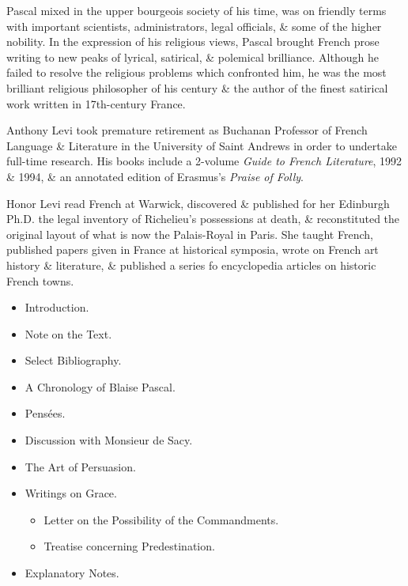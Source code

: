 \documentclass{article}
\begin{document}
\begin{enumerate}
	{\sc Pascal} mixed in the upper bourgeois society of his time, was on friendly terms with important scientists, administrators, legal officials, \& some of the higher nobility. In the expression of his religious views, {\sc Pascal} brought French prose writing to new peaks of lyrical, satirical, \& polemical brilliance. Although he failed to resolve the religious problems which confronted him, he was the most brilliant religious philosopher of his century \& the author of the finest satirical work written in 17th-century France.
	
	{\sc Anthony Levi} took premature retirement as Buchanan Professor of French Language \& Literature in the University of Saint Andrews in order to undertake full-time research. His books include a 2-volume {\it Guide to French Literature}, 1992 \& 1994, \& an annotated edition of {\sc Erasmus}'s {\it Praise of Folly}.
	
	{\sc Honor Levi} read French at Warwick, discovered \& published for her Edinburgh Ph.D. the legal inventory of Richelieu's possessions at death, \& reconstituted the original layout of what is now the Palais-Royal in Paris. She taught French, published papers given in France at historical symposia, wrote on French art history \& literature, \& published a series fo encyclopedia articles on historic French towns.
	\begin{itemize}
		\item {\sf Introduction.}
		\item {\sf Note on the Text.}
		\item {\sf Select Bibliography.}
		\item {\sf A Chronology of {\sc Blaise Pascal}.}
		\item {\sf Pens\'ees.}
		\item {\sf Discussion with Monsieur de Sacy.}
		\item {\sf The Art of Persuasion.}
		\item {\sf Writings on Grace.}
		\begin{itemize}
			\item {\sf Letter on the Possibility of the Commandments.}
			\item {\sf Treatise concerning Predestination.}
		\end{itemize}
		\item {\sf Explanatory Notes.}
	\end{itemize}
\end{enumerate}

\end{document}
